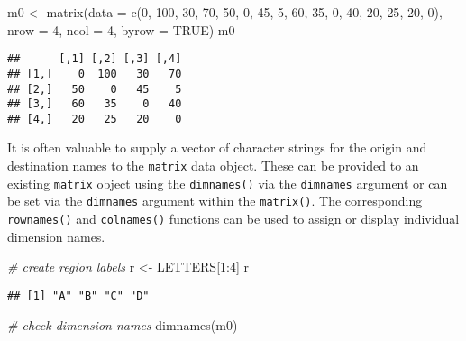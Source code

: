 \documentclass[
]{book}
\newenvironment{Shaded}{\begin{snugshade}}{\end{snugshade}}
\newcommand{\AttributeTok}[1]{\textcolor[rgb]{0.77,0.63,0.00}{#1}}
\newcommand{\CommentTok}[1]{\textcolor[rgb]{0.56,0.35,0.01}{\textit{#1}}}
\newcommand{\ConstantTok}[1]{\textcolor[rgb]{0.00,0.00,0.00}{#1}}
\newcommand{\DecValTok}[1]{\textcolor[rgb]{0.00,0.00,0.81}{#1}}
\newcommand{\FunctionTok}[1]{\textcolor[rgb]{0.00,0.00,0.00}{#1}}
\newcommand{\NormalTok}[1]{#1}
\newcommand{\OtherTok}[1]{\textcolor[rgb]{0.56,0.35,0.01}{#1}}
\newcommand{\SpecialCharTok}[1]{\textcolor[rgb]{0.00,0.00,0.00}{#1}}
\begin{document}
\begin{Shaded}
\begin{Highlighting}[]
\NormalTok{m0 }\OtherTok{\textless{}{-}} \FunctionTok{matrix}\NormalTok{(}\AttributeTok{data =} \FunctionTok{c}\NormalTok{(}\DecValTok{0}\NormalTok{, }\DecValTok{100}\NormalTok{, }\DecValTok{30}\NormalTok{, }\DecValTok{70}\NormalTok{, }\DecValTok{50}\NormalTok{, }\DecValTok{0}\NormalTok{, }\DecValTok{45}\NormalTok{, }\DecValTok{5}\NormalTok{, }\DecValTok{60}\NormalTok{, }\DecValTok{35}\NormalTok{, }\DecValTok{0}\NormalTok{, }\DecValTok{40}\NormalTok{, }\DecValTok{20}\NormalTok{, }\DecValTok{25}\NormalTok{, }\DecValTok{20}\NormalTok{, }\DecValTok{0}\NormalTok{),}
             \AttributeTok{nrow =} \DecValTok{4}\NormalTok{, }\AttributeTok{ncol =} \DecValTok{4}\NormalTok{, }\AttributeTok{byrow =} \ConstantTok{TRUE}\NormalTok{)}
\NormalTok{m0}
\end{Highlighting}
\end{Shaded}

\begin{verbatim}
##      [,1] [,2] [,3] [,4]
## [1,]    0  100   30   70
## [2,]   50    0   45    5
## [3,]   60   35    0   40
## [4,]   20   25   20    0
\end{verbatim}

It is often valuable to supply a vector of character strings for the origin and destination names to the \texttt{matrix} data object. These can be provided to an existing \texttt{matrix} object using the \texttt{dimnames()} via the \texttt{dimnames} argument or can be set via the \texttt{dimnames} argument within the \texttt{matrix()}. The corresponding \texttt{rownames()} and \texttt{colnames()} functions can be used to assign or display individual dimension names.

\begin{Shaded}
\begin{Highlighting}[]
\CommentTok{\# create region labels}
\NormalTok{r }\OtherTok{\textless{}{-}}\NormalTok{ LETTERS[}\DecValTok{1}\SpecialCharTok{:}\DecValTok{4}\NormalTok{]}
\NormalTok{r}
\end{Highlighting}
\end{Shaded}

\begin{verbatim}
## [1] "A" "B" "C" "D"
\end{verbatim}

\begin{Shaded}
\begin{Highlighting}[]
\CommentTok{\# check dimension names}
\FunctionTok{dimnames}\NormalTok{(m0)}
\end{Highlighting}
\end{Shaded}
\end{document}
